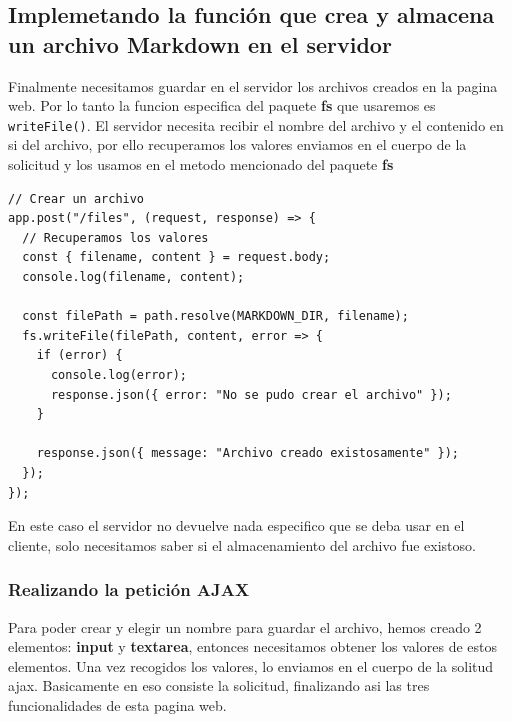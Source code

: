 \subsection{Implemetando la función que crea y almacena un archivo Markdown en el servidor}
Finalmente necesitamos guardar en el servidor los archivos creados en la pagina web. Por lo tanto la funcion especifica del paquete \textbf{fs} que usaremos es \texttt{writeFile()}. 
\singlespacing
El servidor necesita recibir el nombre del archivo y el contenido en si del archivo, por ello recuperamos los valores enviamos en el cuerpo de la solicitud y los usamos en el metodo mencionado del paquete \textbf{fs}

\begin{verbatim}
// Crear un archivo
app.post("/files", (request, response) => {
  // Recuperamos los valores
  const { filename, content } = request.body;
  console.log(filename, content);

  const filePath = path.resolve(MARKDOWN_DIR, filename);
  fs.writeFile(filePath, content, error => {
    if (error) {
      console.log(error);
      response.json({ error: "No se pudo crear el archivo" });
    }

    response.json({ message: "Archivo creado existosamente" });
  });
});
\end{verbatim}

En este caso el servidor no devuelve nada especifico que se deba usar en el cliente, solo necesitamos saber si el almacenamiento del archivo fue existoso.

\subsubsection{Realizando la petición AJAX}
Para poder crear y elegir un nombre para guardar el archivo, hemos creado 2 elementos: \textbf{input} y \textbf{textarea}, entonces necesitamos obtener los valores de estos elementos. Una vez recogidos los valores, lo enviamos en el cuerpo de la solitud ajax. Basicamente en eso consiste la solicitud, finalizando asi las tres funcionalidades de esta pagina web.

